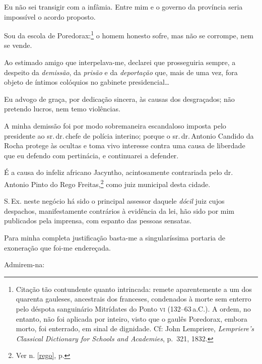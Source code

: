 Eu não sei transigir com a infâmia. Entre mim e o governo da província
seria impossível o acordo proposto.

Sou da escola de Poredorax:\footnote{Citação tão contundente quanto
  intrincada: remete aparentemente a um dos quarenta gauleses,
  ancestrais dos franceses, condenados à morte sem enterro pelo déspota
  sanguinário Mitrídates do Ponto \textsc{vi} (132--63\,a.C.). A ordem, no
  entanto, não foi aplicada por inteiro, visto que o gaulês Poredorax,
  embora morto, foi enterrado, em sinal de dignidade. Cf: John
  Lempriere, \emph{Lempriere's Classical Dictionary for Schools and
  Academies}, p.~321, 1832.} o homem honesto sofre, mas não se
corrompe, nem se vende.

Ao estimado amigo que interpelava-me, declarei que prosseguiria sempre,
a despeito da \emph{demissão}, da \emph{prisão} e da \emph{deportação}
que, mais de uma vez, fora objeto de íntimos colóquios no gabinete
presidencial\ldots{}

Eu advogo de graça, por dedicação sincera, às causas dos desgraçados;
não pretendo lucros, nem temo violências.

A minha demissão foi por modo sobremaneira escandaloso imposta pelo
presidente ao sr.\,dr.\,chefe de polícia interino; porque o sr.\,dr.\,Antonio Candido da Rocha protege às ocultas e toma vivo interesse contra
uma causa de liberdade que eu defendo com pertinácia, e continuarei a
defender.

É a causa do infeliz africano Jacyntho, acintosamente contrariada pelo
dr.\,Antonio Pinto do Rego Freitas,\footnote{Ver n. \ref{rego}, p. \pageref{rego}} 
como juiz municipal desta cidade.

S.\,Ex. neste negócio há sido o principal assessor daquele \emph{dócil}
juiz cujos despachos, manifestamente contrários à evidência da lei, hão
sido por mim publicados pela imprensa, com espanto das pessoas sensatas.

Para minha completa justificação basta-me a singularíssima portaria de
exoneração que foi-me endereçada.

Admirem-na:

